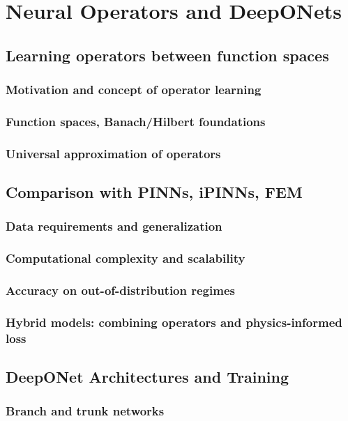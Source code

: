 ﻿\chapter{Neural Operators and DeepONets}
\section{Learning operators between function spaces}
\subsection{Motivation and concept of operator learning} %
\subsection{Function spaces, Banach/Hilbert foundations} %
\subsection{Universal approximation of operators} %
\section{Comparison with PINNs, iPINNs, FEM}
\subsection{Data requirements and generalization} %
\subsection{Computational complexity and scalability} %
\subsection{Accuracy on out-of-distribution regimes} %
\subsection{Hybrid models: combining operators and physics-informed loss} %

\section{DeepONet Architectures and Training} %
\subsection{Branch and trunk networks} %
